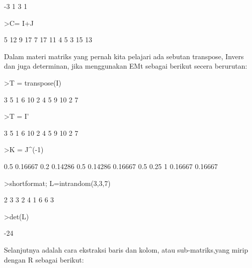 \documentclass[a4paper,10pt]{article}
\begin{document}
\begin{eulernotebook}
\begin{eulercomment}
\begin{eulercomment}
\begin{eulercomment}
\begin{eulercomment}
\begin{eulercomment}
\begin{eulercomment}
\begin{eulercomment}
\begin{eulercomment}
\begin{eulercomment}
\begin{eulercomment}
\begin{euleroutput}
         -3         1         3         1 
\end{euleroutput}
\begin{eulerprompt}
>C= I+J
\end{eulerprompt}
\begin{euleroutput}
          5        12         9        17 
          7        17        11         4 
          5         3        15        13 
\end{euleroutput}
\begin{eulercomment}
Dalam materi matriks yang pernah kita pelajari ada sebutan transpose,
Invers dan juga determinan, jika menggunakan EMt sebagai berikut
secera berurutan:
\end{eulercomment}
\begin{eulerprompt}
>T = transpose(I)
\end{eulerprompt}
\begin{euleroutput}
          3         5         1 
          6        10         2 
          4         5         9 
         10         2         7 
\end{euleroutput}
\begin{eulerprompt}
>T = I'
\end{eulerprompt}
\begin{euleroutput}
          3         5         1 
          6        10         2 
          4         5         9 
         10         2         7 
\end{euleroutput}
\begin{eulerprompt}
>K = J^(-1)
\end{eulerprompt}
\begin{euleroutput}
        0.5   0.16667       0.2   0.14286 
        0.5   0.14286   0.16667       0.5 
       0.25         1   0.16667   0.16667 
\end{euleroutput}
\begin{eulerprompt}
>shortformat; L=intrandom(3,3,7)
\end{eulerprompt}
\begin{euleroutput}
          2         3         3 
          2         4         1 
          6         6         3 
\end{euleroutput}
\begin{eulerprompt}
>det(L)
\end{eulerprompt}
\begin{euleroutput}
  -24
\end{euleroutput}
\begin{eulercomment}
Selanjutnya adalah cara ekstraksi baris dan kolom, atau
sub-matriks,yang  mirip dengan R sebagai berikut:


\end{eulercomment}
\end{eulercomment}
\end{eulercomment}
\end{eulercomment}
\end{eulercomment}
\end{eulercomment}
\end{eulercomment}
\end{eulercomment}
\end{eulercomment}
\end{eulercomment}
\end{eulercomment}
\end{eulernotebook}
\end{document}
